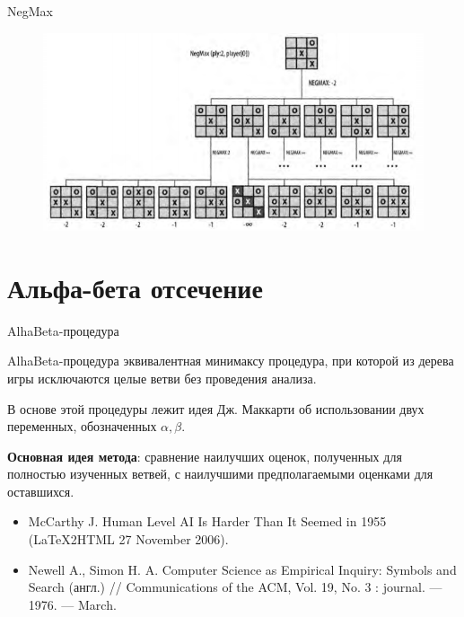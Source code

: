 \documentclass{beamer}
\begin{document}
\begin{frame}{NegMax}
\begin{figure}[h]
\centering
\includegraphics[scale=0.6]{images/lec05-pic07.png}
\end{figure}
\end{frame}

\section{Альфа-бета отсечение}

\begin{frame}{AlhaBeta-процедура}
\begin{block}{AlhaBeta-процедура}
эквивалентная минимаксу процедура, при которой из дерева игры исключаются целые ветви без проведения анализа. 
\end{block}
В основе этой процедуры лежит идея Дж. Маккарти об использовании двух переменных, обозначенных $\alpha, \beta$.

\textbf{Основная идея метода}: сравнение наилучших оценок, полученных для полностью изученных ветвей, с наилучшими предполагаемыми оценками для оставшихся. 

\begin{itemize}
\item McCarthy J. Human Level AI Is Harder Than It Seemed in 1955 (LaTeX2HTML 27 November 2006). 
\item Newell A., Simon H. A. Computer Science as Empirical Inquiry: Symbols and Search (англ.) // Communications of the ACM, Vol. 19, No. 3 : journal. — 1976. — March. 
\end{itemize}
\end{frame}
\end{document}
